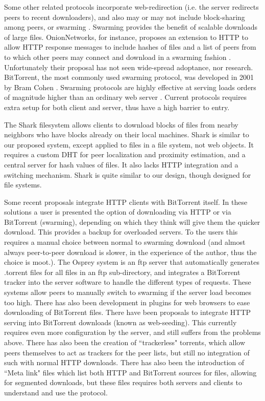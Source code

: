 Some other related protocols incorporate web-redirection (i.e. the server redirects peers to recent downloaders), and also may or may not include block-sharing among peers, or swarming \cite{overhaul, webtorrent, onion, zappala, cohen, slurpie, mutualcast, fastreplica, avalanche, bullet_prime}.  Swarming provides the benefit of scalable downloads of large files.  OnionNetworks, for instance, proposes an extension to HTTP to allow HTTP response messages to include hashes of files and a list of peers from to which other peers may connect and download in a swarming fashion \cite{onion}.  Unfortunately their proposal has not seen wide-spread adoptance, nor research.  BitTorrent, the most commonly used swarming protocol, was developed in 2001 by Bram Cohen \cite{cohen}.  Swarming protocols are highly effective at serving loads orders of magnitude higher than an ordinary web server \cite{zappala}. Current protocols requires extra setup for both client and server, thus have a high barrier to entry.

The Shark \cite{shark} filesystem allows clients to download blocks of files from nearby neighbors who have blocks already on their local machines.  Shark is similar to our proposed system, except applied to files in a file system, not web objects.  It  requires a custom DHT for peer localization and proximity estimation, and a central server for hash values of files.  It also lacks HTTP integration and a switching mechanism.  Shark is quite similar to our design, though designed for file systems.

Some recent proposals integrate HTTP clients with BitTorrent itself.  In these solutions a user is presented the option of downloading via HTTP or via BitTorrent (swarming), 
depending on which they think will give them the quicker download.  This provides a backup for overloaded servers.  To the users this requires a manual choice between normal to 
swarming download (and almost always peer-to-peer download is slower, in the experience of the author, thus the choice is moot.).  
The Osprey system \cite{osprey} is an ftp server that automatically generates .torrent files for all files in an ftp sub-directory, 
and integrates a BitTorrent tracker into the server software to handle the different types of requests.  
These systems allow peers to manually switch to swarming if the server load becomes too high.  
There has also been development in plugins for web browsers to ease downloading of BitTorrent files.
There have been proposals to integrate HTTP serving into BitTorrent downloads (known as web-seeding).  This currently requires even more configuration by the server, and still suffers from 
the problems above.  There has also been the creation of ``trackerless" torrents, which allow peers themselves to act as trackers for the peer lists, but still no integration of such
with normal HTTP downloads.  There has also been the introduction of ``Meta link" files which list both HTTP and BitTorrent sources for files, allowing for segmented downloads, but these
files requires both servers and clients to understand and use the protocol.

